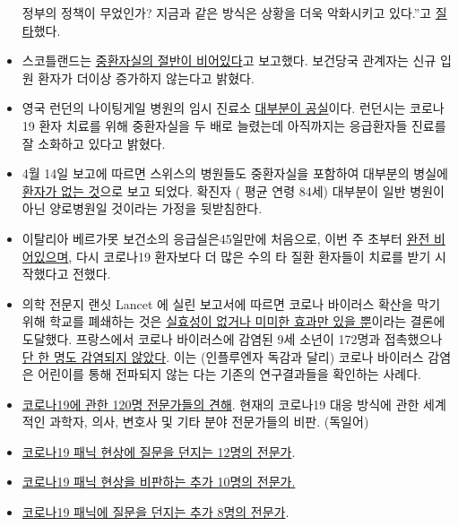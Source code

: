\begin{itemize}
  정부의 정책이 무었인가? 지금과 같은 방식은 상황을 더욱 악화시키고
  있다.''고
  \href{https://drmalcolmkendrick.org/2020/04/17/care-homes-and-covid19/}{질타}했다.
  ~~
\item
  스코틀랜드는
  \href{https://www.heraldscotland.com/news/18377095.coronavirus-scotland-half-icu-beds-empty/}{중환자실의
  절반이 비어있다}고 보고했다. 보건당국 관계자는 신규 입원 환자가 더이상
  증가하지 않는다고 밝혔다. 
\item
  영국 런던의 나이팅게일 병원의 임시 진료소
  \href{https://www.hsj.co.uk/service-design/exclusive-nightingale-largely-empty-as-icus-handle-surge/7027398.article}{대부분이
  공실}이다. 런던시는 코로나19 환자 치료를 위해 중환자실을 두 배로
  늘렸는데 아직까지는 응급환자들 진료를 잘 소화하고 있다고 밝혔다. ~~
\item
  4월 14일 보고에 따르면 스위스의 병원들도 중환자실을 포함하여 대부분의
  병실에
  \href{https://swprs.files.wordpress.com/2020/04/intensivbettenbelegung-schweiz-2020-04-14.png}{환자가
  없는 것}으로 보고 되었다. 확진자 ( 평균 연령 84세) 대부분이 일반
  병원이 아닌 양로병원일 것이라는 가정을 뒷받침한다. ~~
\item
  이탈리아 베르가못 보건소의 응급실은45일만에 처음으로, 이번 주 초부터
  \href{https://orf.at/stories/3162642/}{완전 비어있으며}, 다시 코로나19
  환자보다 더 많은 수의 타 질환 환자들이 치료를 받기 시작했다고 전했다. 
\item
  의학 전문지 랜싯 Lancet 에 실린 보고서에 따르면 코로나 바이러스 확산을
  막기 위해 학교를 폐쇄하는 것은
  \href{https://www.thelancet.com/journals/lanchi/article/PIIS2352-4642(20)30095-X/fulltext}{실효성이
  없거나 미미한 효과만 있을 뿐}이라는 결론에 도달했다. 프랑스에서 코로나
  바이러스에 감염된 9세 소년이 172명과 접촉했으나
  \href{https://www.n-tv.de/panorama/172-Kontaktpersonen-von-Corona-verschont-article21727469.html}{단
  한 명도 감염되지 않았다}. 이는 (인플루엔자 독감과 달리) 코로나
  바이러스 감염은 어린이를 통해 전파되지 않는 다는 기존의 연구결과들을
  확인하는 사례다. 
\item
  \href{https://www.rubikon.news/artikel/120-expertenstimmen-zu-corona}{코로나19에
  관한 120명 전문가들의 견해}. 현재의 코로나19 대응 방식에 관한 세계적인
  과학자, 의사, 변호사 및 기타 분야 전문가들의 비판. (독일어) 
\item
  \href{https://off-guardian.org/2020/03/24/12-experts-questioning-the-coronavirus-panic/}{코로나19
  패닉 현상에 질문을 던지는 12명의 전문가}.
\item
  \href{https://off-guardian.org/2020/03/28/10-more-experts-criticising-the-coronavirus-panic/}{코로나19
  패닉 현상을 비판하는 추가 10명의 전문가.}
\item
  \href{https://off-guardian.org/2020/04/17/8-more-experts-questioning-the-coronavirus-panic/}{코로나19
  패닉에 질문을 던지는 추가 8명의 전문가}.\\
\end{itemize}

